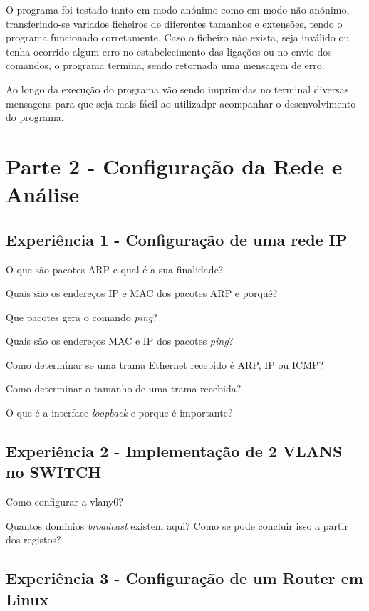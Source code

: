 \documentclass[11pt]{article}
\begin{document}
O programa foi testado tanto em modo anónimo como em modo não anónimo, transferindo-se variados ficheiros de diferentes tamanhos e extensões, tendo o programa funcionado corretamente. Caso o ficheiro não exista, seja inválido ou tenha ocorrido algum erro no estabelecimento das ligações ou no envio dos comandos, o programa termina, sendo retornada uma mensagem de erro. 

Ao longo da execução do programa vão sendo imprimidas no terminal diversas mensagens para que seja mais fácil ao utilizadpr acompanhar o desenvolvimento do programa.

\section{Parte 2 - Configuração da Rede e Análise} 

\subsection{Experiência 1 - Configuração de uma rede IP}

 O que são pacotes ARP e qual é a sua finalidade?

 Quais são os endereços IP e MAC dos pacotes ARP e porquê?

 Que pacotes gera o comando \emph{ping}?

 Quais são os endereços MAC e IP dos pacotes \emph{ping}?

 Como determinar se uma trama Ethernet recebido é ARP, IP ou ICMP?

 Como determinar o tamanho de uma trama recebida?

 O que é a interface \emph{loopback} e porque é importante?

\subsection{Experiência 2 - Implementação de 2 VLANS no SWITCH}

 Como configurar a vlany0?

 Quantos domínios \emph{broadcast} existem aqui? Como se pode concluir isso a partir dos registos?

\subsection{Experiência 3 - Configuração de um Router em Linux}
\end{document}
